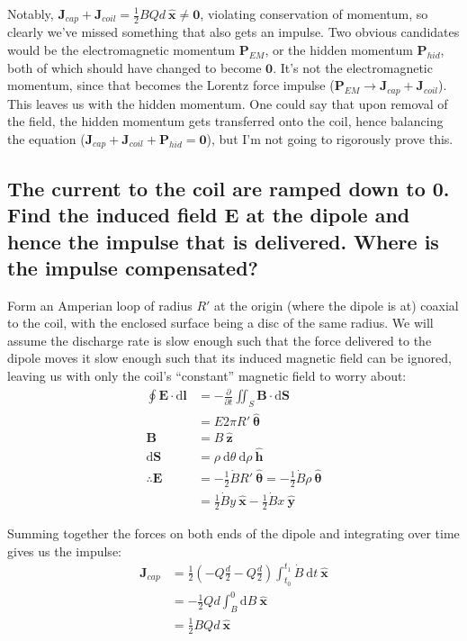 \documentclass[a4paper]{scrartcl}
\begin{document}
Notably, \(\mathbf{J}_{cap} + \mathbf{J}_{coil} = \frac{1}{2} B Q d \:\hat{\mathbf{x}} \neq \mathbf{0}\), violating conservation of momentum, so clearly we've missed something that also gets an impulse. Two obvious candidates would be the electromagnetic momentum \(\mathbf{P}_{EM}\), or the hidden momentum \(\mathbf{P}_{hid}\), both of which should have changed to become \(\mathbf{0}\). It's not the electromagnetic momentum, since that becomes the Lorentz force impulse (\(\mathbf{P}_{EM} \to \mathbf{J}_{cap} + \mathbf{J}_{coil}\)). This leaves us with the hidden momentum. One could say that upon removal of the field, the hidden momentum gets transferred onto the coil, hence balancing the equation (\(\mathbf{J}_{cap} + \mathbf{J}_{coil} + \mathbf{P}_{hid} = \mathbf{0}\)), but I'm not going to rigorously prove this.

\subsection{The current to the coil are ramped down to 0. Find the induced field \(\mathbf{E}\) at the dipole and hence the impulse that is delivered. Where is the impulse compensated?}
Form an Amperian loop of radius \(R'\) at the origin (where the dipole is at) coaxial to the coil, with the enclosed surface being a disc of the same radius. We will assume the discharge rate is slow enough such that the force delivered to the dipole moves it slow enough such that its induced magnetic field can be ignored, leaving us with only the coil's ``constant'' magnetic field to worry about:
\begin{align*}
    \oint \mathbf{E} \cdot \mathrm{d}\mathbf{l} &= -\frac{\partial}{\partial t} \iint_S \mathbf{B} \cdot \mathrm{d}\mathbf{S} \\
    &= E 2 \pi R' \:\hat{\boldsymbol{\theta}} \\
    \mathbf{B} &= B \:\hat{\mathbf{z}} \\
    \mathrm{d}\mathbf{S} &= \rho \:\mathrm{d}\theta \:\mathrm{d}\rho \:\hat{\mathbf{h}} \\
    \therefore \mathbf{E} &= -\frac{1}{2} \dot{B} R' \:\hat{\boldsymbol{\theta}} = -\frac{1}{2} \dot{B} \rho \:\hat{\boldsymbol{\theta}} \\
    &= \frac{1}{2} \dot{B} y \:\hat{\mathbf{x}} - \frac{1}{2} \dot{B} x \:\hat{\mathbf{y}}
\end{align*}

Summing together the forces on both ends of the dipole and integrating over time gives us the impulse:
\begin{align*}
    \mathbf{J}_{cap} &= \frac{1}{2} \left(-Q \frac{d}{2} - Q \frac{d}{2}\right) \int_{t_0}^{t_1} \dot{B} \:\mathrm{d}t \:\hat{\mathbf{x}} \\
    &= -\frac{1}{2} Q d \int_{B}^{0} \mathrm{d}B \:\hat{\mathbf{x}} \\
    &= \frac{1}{2} B Q d \:\hat{\mathbf{x}}
\end{align*}
\end{document}
